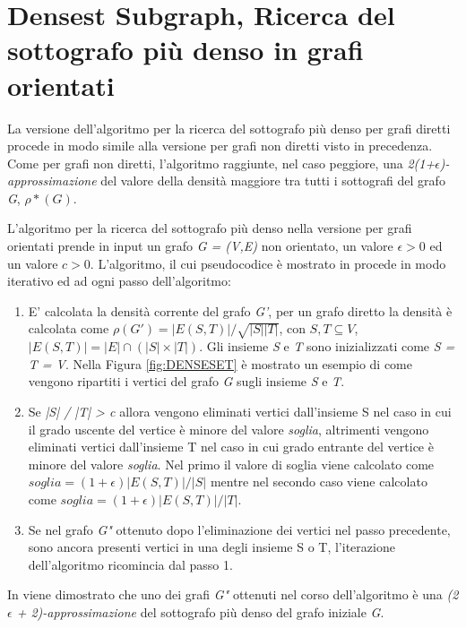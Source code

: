 \documentclass[LaM,binding=0.6cm]{sapthesis}
\begin{document}
\section{Densest Subgraph, Ricerca del sottografo più denso in grafi orientati}

La versione dell'algoritmo per la ricerca del sottografo più denso \cite{Bahmani:2012:DSS:2140436.2140442} per grafi diretti procede in modo simile alla versione per grafi non diretti visto in precedenza. Come per grafi non diretti, l'algoritmo raggiunte, nel caso peggiore, una \textit{2(1+$\epsilon$)-approssimazione} del valore della densità maggiore tra tutti i sottografi del grafo \textit{G}, \textit{$\rho*(G)$}.

L'algoritmo per la  ricerca del sottografo più denso nella versione per grafi orientati prende in input un grafo \textit{G = (V,E)} non orientato, un valore \textit{$\epsilon > 0$} ed un valore \textit{$c > 0$}.
L'algoritmo, il cui pseudocodice è mostrato in  procede in modo iterativo ed ad ogni passo dell'algoritmo:
\begin{enumerate}
\item E' calcolata la densità corrente del grafo \textit{G'}, per un grafo diretto la densità è calcolata come \textit{$\rho(G') = |E(S,T)| /  \sqrt{|S| |T|} $}, con \textit{$S,T \subseteq V$}, $|E(S,T)| = |E| \cap (|S| \times |T|)$. Gli insieme \textit{S} e \textit{T} sono inizializzati come \textit{S = T = V}. Nella Figura \ref{fig:DENSESET} è mostrato un esempio di come vengono ripartiti i vertici del grafo \textit{G} sugli insieme \textit{S} e \textit{T}.
\item Se \textit{|S| / |T| > c} allora vengono eliminati vertici dall'insieme S nel caso in cui il grado uscente del vertice è minore del valore \textit{soglia}, altrimenti vengono eliminati vertici dall'insieme T nel caso in cui grado entrante del vertice è minore del valore \textit{soglia}.
Nel primo il valore di soglia viene calcolato come \textit{$soglia = (1 + \epsilon) |E(S,T)| / |S|$} mentre nel secondo caso viene calcolato come \textit{$soglia = (1 + \epsilon) |E(S,T)| / |T|$}.
\item Se nel grafo \textit{G"} ottenuto dopo l'eliminazione dei vertici nel passo precedente, sono ancora presenti vertici in una degli insieme S o T, l'iterazione dell'algoritmo ricomincia dal passo 1.
\end{enumerate}

In \cite{Bahmani:2012:DSS:2140436.2140442} viene dimostrato che uno dei grafi \textit{G"} ottenuti nel corso dell'algoritmo  è una \textit{(2$\epsilon$ + 2)-approssimazione} del sottografo più denso del grafo iniziale \textit{G}.
\end{document}
